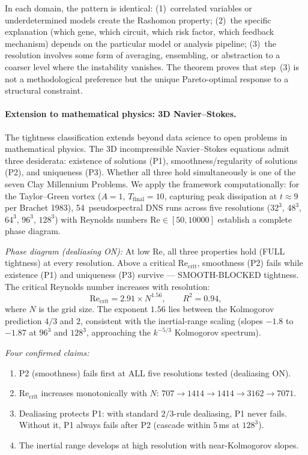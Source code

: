 \documentclass[11pt,a4paper]{article}
\begin{document}
In each domain, the pattern is identical: (1)~correlated variables or underdetermined models create the Rashomon property; (2)~the specific explanation (which gene, which circuit, which risk factor, which feedback mechanism) depends on the particular model or analysis pipeline; (3)~the resolution involves some form of averaging, ensembling, or abstraction to a coarser level where the instability vanishes.  The theorem proves that step~(3) is not a methodological preference but the unique Pareto-optimal response to a structural constraint.

\paragraph{Extension to mathematical physics: 3D Navier--Stokes.}\label{sec:ns-experiments}
The tightness classification extends beyond data science to open problems in mathematical physics.  The 3D incompressible Navier--Stokes equations admit three desiderata: existence of solutions (P1), smoothness/regularity of solutions (P2), and uniqueness (P3).  Whether all three hold simultaneously is one of the seven Clay Millennium Problems.  We apply the framework computationally: for the Taylor--Green vortex ($A = 1$, $T_{\mathrm{final}} = 10$, capturing peak dissipation at $t \approx 9$ per Brachet 1983), 54~pseudospectral DNS runs across five resolutions ($32^3$, $48^3$, $64^3$, $96^3$, $128^3$) with Reynolds numbers $\mathrm{Re} \in [50, 10000]$ establish a complete phase diagram.

\emph{Phase diagram (dealiasing ON):}
At low Re, all three properties hold (FULL tightness) at every resolution.  Above a critical $\mathrm{Re}_{\mathrm{crit}}$, smoothness (P2) fails while existence (P1) and uniqueness (P3) survive --- SMOOTH-BLOCKED tightness.  The critical Reynolds number increases with resolution:
\[
  \mathrm{Re}_{\mathrm{crit}} = 2.91 \times N^{1.56}, \qquad R^2 = 0.94,
\]
where $N$ is the grid size.  The exponent $1.56$ lies between the Kolmogorov prediction $4/3$ and $2$, consistent with the inertial-range scaling (slopes $-1.8$ to $-1.87$ at $96^3$ and $128^3$, approaching the $k^{-5/3}$ Kolmogorov spectrum).

\emph{Four confirmed claims:}
\begin{enumerate}
  \item P2 (smoothness) fails first at ALL five resolutions tested (dealiasing ON).
  \item $\mathrm{Re}_{\mathrm{crit}}$ increases monotonically with $N$: $707 \to 1414 \to 1414 \to 3162 \to 7071$.
  \item Dealiasing protects P1: with standard $2/3$-rule dealiasing, P1 never fails.  Without it, P1 always fails after P2 (cascade within 5\,ms at $128^3$).
  \item The inertial range develops at high resolution with near-Kolmogorov slopes.
\end{enumerate}
\end{document}
